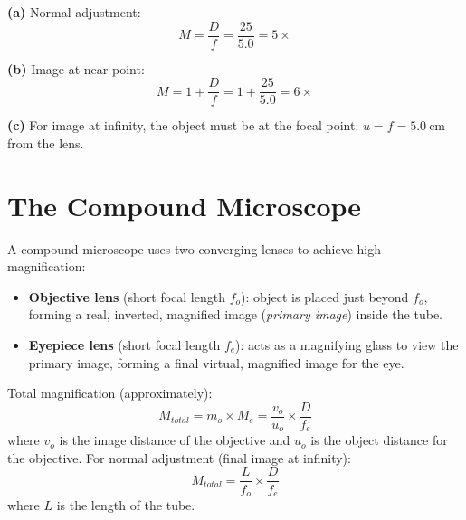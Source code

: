 \begin{solutionbox}
\textbf{(a)} Normal adjustment:
\[
  M = \frac{D}{f} = \frac{25}{5.0} = 5\times
\]

\textbf{(b)} Image at near point:
\[
  M = 1 + \frac{D}{f} = 1 + \frac{25}{5.0} = 6\times
\]

\textbf{(c)} For image at infinity, the object must
be at the focal point: $u = f = 5.0\ \text{cm}$ from
the lens.
\end{solutionbox}

\section{The Compound Microscope}

\begin{processbox}
A compound microscope uses two converging lenses
to achieve high magnification:
\begin{itemize}[noitemsep]
  \item \textbf{Objective lens} (short focal length
  $f_o$): object is placed just beyond $f_o$,
  forming a real, inverted, magnified image
  (\textit{primary image}) inside the tube.
  \item \textbf{Eyepiece lens} (short focal length
  $f_e$): acts as a magnifying glass to view the
  primary image, forming a final virtual, magnified
  image for the eye.
\end{itemize}
Total magnification (approximately):
\[
  M_{total} = m_o \times M_e
  = \frac{v_o}{u_o} \times \frac{D}{f_e}
\]
where $v_o$ is the image distance of the objective
and $u_o$ is the object distance for the objective.
For normal adjustment (final image at infinity):
\[
  M_{total} = \frac{L}{f_o} \times \frac{D}{f_e}
\]
where $L$ is the length of the tube.
\end{processbox}


